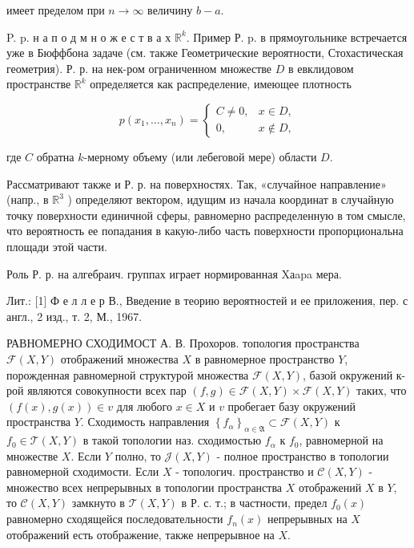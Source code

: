 \documentclass[10pt]{article}
\begin{document}
имеет пределом при $n \rightarrow \infty$ величину $b-a$.



P. p. н а п о д м н о ж е с т в а х $\mathbb{R}^{k}$. Пример Р. p. в прямоугольнике встречается уже в Бюффбона задаче (см. также Геометрические вероятности, Стохастическая геометрия). Р. р. на нек-ром ограниченном множестве $D$ в евклидовом пространстве $\mathbb{R}^{k}$ определяется как распределение, имеющее плотность



\[

p\left(x_{1}, \ldots, x_{n}\right)=\left\{\begin{array}{cc}

C \neq 0, & x \in D, \\

0, & x \notin D,

\end{array}\right.

\]



где $C$ обратна $k$-мерному объему (или лебеговой мере) области $D$.



Рассматривают также и Р. р. на поверхностях. Так, «случайное направление» (напр., в $\mathbb{R}^{3}$ ) определяют вектором, идущим из начала координат в случайную точку поверхности единичной сферы, равномерно распределенную в том смысле, что вероятность ее попадания в какую-либо часть поверхности пропорциональна площади этой части.



Роль Р. р. на алгебраич. группах играет нормированная Xаapa мера.



Лит.: [1] Ф е л л е р В., Введение в теорию вероятностей и ее приложения, пер. с англ., 2 изд., т. 2, М., 1967.



РАВНОМЕРНО СХОДИМОСТ А. В. Прохоров. топология пространства $\mathscr{F}(X, Y)$ отображений множества $X$ в равномерное пространство $Y$, порожденная равномерной структурой множества $\mathscr{F}(X, Y)$, базой окружений к-рой являются совокупности всех пар $(f, g) \in \mathscr{F}(X, Y) \times \mathscr{F}(X, Y)$ таких, что $(f(x), g(x)) \in v$ для любого $x \in X$ и $v$ пробегает базу окружений пространства $Y$. Сходимость направления $\left\{f_{\alpha}\right\}_{\alpha \in \mathfrak{A}} \subset \mathcal{F}(X, Y)$ к $f_{0} \in \mathscr{T}(X, Y)$ в такой топологии наз. сходимостью $f_{\alpha}$ к $f_{0}$, равномерной на множестве $X$. Если $Y$ полно, то $\mathscr{J}(X, Y)$ - полное пространство в топологии равномерной сходимости. Если $X$ - топологич. пространство и $\mathscr{C}(X, Y)$ - множество всех непрерывных в топологии пространства $X$ отображений $X$ в $Y$, то $\mathscr{C}(X, Y)$ замкнуто в $\mathscr{T}(X, Y)$ в Р. с. т.; в частности, предел $f_{0}(x)$ равномерно сходящейся последовательности $f_{n}(x)$ непрерывных на $X$ отображений есть отображение, также непрерывное на $X$.
\end{document}
